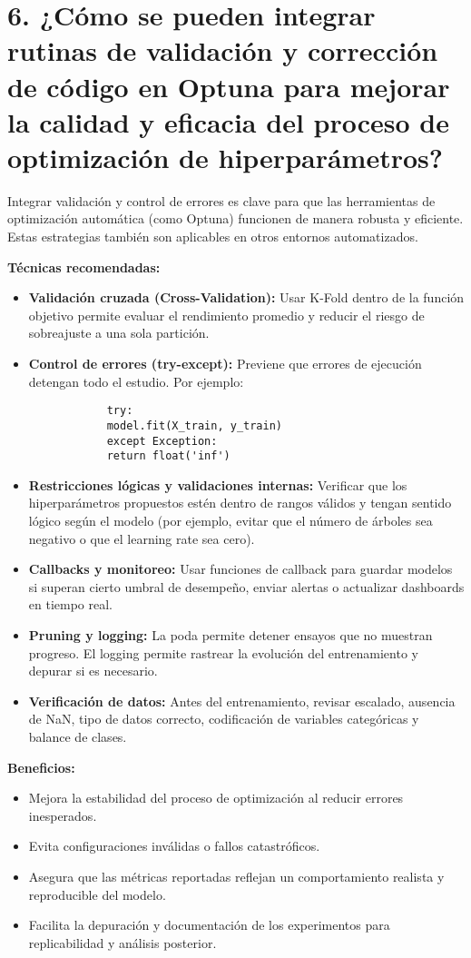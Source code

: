 \documentclass[a4paper,12pt]{article}
\begin{document}
	\section*{6. ¿Cómo se pueden integrar rutinas de validación y corrección de código en Optuna para mejorar la calidad y eficacia del proceso de optimización de hiperparámetros?}
	Integrar validación y control de errores es clave para que las herramientas de optimización automática (como Optuna) funcionen de manera robusta y eficiente. Estas estrategias también son aplicables en otros entornos automatizados.
	
	\textbf{Técnicas recomendadas:}
	\begin{itemize}
		\item \textbf{Validación cruzada (Cross-Validation):} Usar K-Fold dentro de la función objetivo permite evaluar el rendimiento promedio y reducir el riesgo de sobreajuste a una sola partición.
		\item \textbf{Control de errores (try-except):} Previene que errores de ejecución detengan todo el estudio. Por ejemplo:
		\begin{verbatim}
			try:
			model.fit(X_train, y_train)
			except Exception:
			return float('inf')
		\end{verbatim}
		\item \textbf{Restricciones lógicas y validaciones internas:} Verificar que los hiperparámetros propuestos estén dentro de rangos válidos y tengan sentido lógico según el modelo (por ejemplo, evitar que el número de árboles sea negativo o que el learning rate sea cero).
		\item \textbf{Callbacks y monitoreo:} Usar funciones de callback para guardar modelos si superan cierto umbral de desempeño, enviar alertas o actualizar dashboards en tiempo real.
		\item \textbf{Pruning y logging:} La poda permite detener ensayos que no muestran progreso. El logging permite rastrear la evolución del entrenamiento y depurar si es necesario.
		\item \textbf{Verificación de datos:} Antes del entrenamiento, revisar escalado, ausencia de NaN, tipo de datos correcto, codificación de variables categóricas y balance de clases.
	\end{itemize}
	
	\textbf{Beneficios:}
	\begin{itemize}
		\item Mejora la estabilidad del proceso de optimización al reducir errores inesperados.
		\item Evita configuraciones inválidas o fallos catastróficos.
		\item Asegura que las métricas reportadas reflejan un comportamiento realista y reproducible del modelo.
		\item Facilita la depuración y documentación de los experimentos para replicabilidad y análisis posterior.
	\end{itemize}
	
\end{document}
